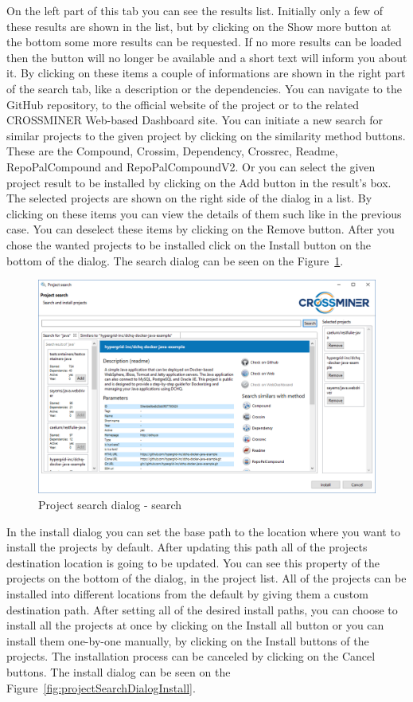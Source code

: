 \documentclass[11pt,a4paper]{book}
\begin{document}
On the left part of this tab you can see the results list. Initially only a few of these results are shown in the list, but by clicking on the Show more button at the bottom some more results can be requested. If no more results can be loaded then the button will no longer be available and a short text will inform you about it. By clicking on these items a couple of informations are shown in the right part of the search tab, like a description or the dependencies. You can navigate to the GitHub repository, to the official website of the project or to the related CROSSMINER Web-based Dashboard site. You can initiate a new search for similar projects to the given project by clicking on the similarity method buttons. These are the Compound, Crossim, Dependency, Crossrec, Readme, RepoPalCompound and RepoPalCompoundV2. Or you can select the given project result to be installed by clicking on the Add button in the result's box. The selected projects are shown on the right side of the dialog in a list. By clicking on these items you can view the details of them such like in the previous case. You can deselect these items by clicking on the Remove button. After you chose the wanted projects to be installed click on the Install button on the bottom of the dialog. The search dialog can be seen on the Figure~\ref{fig:projectSearchDialogSearch}.

\begin{figure}[h]
	\centering
	\includegraphics[width=\linewidth]{pic/project-search-search.png}
	\caption{Project search dialog - search}
	\label{fig:projectSearchDialogSearch}
\end{figure}


In the install dialog you can set the base path to the location where you want to install the projects by default. After updating this path all of the projects destination location is going to be updated. You can see this property of the projects on the bottom of the dialog, in the project list. All of the projects can be installed into different locations from the default by giving them a custom destination path. After setting all of the desired install paths, you can choose to install all the projects at once by clicking on the Install all button or you can install them one-by-one manually, by clicking on the Install buttons of the projects. The installation process can be canceled by clicking on the Cancel buttons. The install dialog can be seen on the Figure~\ref{fig:projectSearchDialogInstall}.
\end{document}
